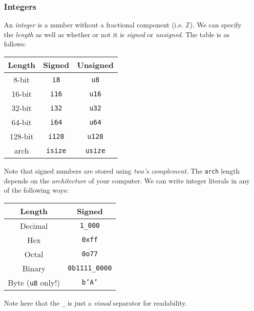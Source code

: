 \documentclass{report}
\begin{document}
\subsubsection{Integers}
An \textit{integer} is a number without a fractional component (i.e. $\mathbb{Z}$). We can specify
the \textit{length} as well as whether or not it is \textit{signed} or \textit{unsigned}. The table
is as follows:
\begin{center}
\centering
\begin{tabular}{ccc}
\toprule
Length & Signed & Unsigned \\
\midrule
8-bit & \texttt{i8} & \texttt{u8} \\
16-bit & \texttt{i16} & \texttt{u16} \\
32-bit & \texttt{i32} & \texttt{u32} \\
64-bit & \texttt{i64} & \texttt{u64} \\
128-bit & \texttt{i128} & \texttt{u128} \\
arch & \texttt{isize} & \texttt{usize} \\
\bottomrule
\end{tabular}
\end{center}
Note that signed numbers are stored using \textit{two's complement}. The \texttt{arch} length depends
on the \textit{architecture} of your computer.
\newline
\newline
We can write integer literals in any of the following ways:
\newline
\begin{center}
\begin{tabular}{cc}
\toprule
Length & Signed \\
\midrule
Decimal & \texttt{1\_000} \\
Hex & \texttt{0xff} \\
Octal & \texttt{0o77} \\
Binary & \texttt{0b1111\_0000} \\
Byte (\texttt{u8} only!) & \texttt{b'A'} \\
\bottomrule
\end{tabular}
\end{center}
Note here that the \texttt{\_} is just a \textit{visual} separator for readability.
\end{document}
